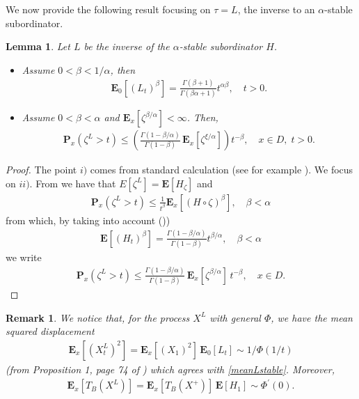 \documentclass[[11pt,a4paper,reqno]{article}
\newtheorem{lemma}{Lemma}
\newtheorem{remark}{Remark}[section]
\numberwithin{equation}{section}
\begin{document}
We now provide the following result focusing on $\tau=L$, the inverse to an $\alpha$-stable subordinator. 
\begin{lemma}
Let $L$ be the inverse of the $\alpha$-stable subordinator $H$. 
\begin{itemize}
\item[i)] Assume $0 < \beta < 1/\alpha$, then
\begin{align}
    \mathbf{E}_0[(L_t)^\beta] = \frac{\Gamma(\beta + 1)}{\Gamma(\beta \alpha + 1)} t^{\alpha \beta}, \quad t>0.
    \label{meanLstable}
\end{align}
\item[ii)] Assume $0< \beta < \alpha$ and $\mathbf{E}_x[\zeta^{\beta/\alpha}]< \infty$. Then, 
    \begin{align}
\mathbf{P}_x(\zeta^L > t) \leq \left( \frac{\Gamma(1-\beta/\alpha)}{\Gamma(1-\beta)} \, \mathbf{E}_x[\zeta^{\xi/\alpha}] \right) t^{-\beta}, \quad x \in D, \; t >0.
\end{align}
\end{itemize}
\end{lemma}

\begin{proof}
The point $i)$ comes from standard calculation (see for example \cite[formula 4.9]{ECPmd}). We focus on $ii)$. From \cite[Theorem 3.1]{CapDovDelRus} we have that $E[\zeta^L] = \mathbf{E}[H_{\zeta}]$ and
\begin{align*}
\mathbf{P}_x(\zeta^L > t) \leq \frac{1}{t^\beta} \mathbf{E}_x[(H\circ \zeta )^\beta], \quad \beta < \alpha
\end{align*}
from which, by taking into account (\cite[formula 4.7]{ECPmd}))
\begin{align}
    \mathbf{E}[(H_t)^\beta] = \frac{\Gamma(1-\beta/\alpha)}{\Gamma(1-\beta)} t^{\beta/\alpha}, \quad \beta < \alpha
    \label{momH}
\end{align}
we write
\begin{align*}
\mathbf{P}_x(\zeta^L > t) \leq \frac{\Gamma(1-\beta/\alpha)}{\Gamma(1-\beta)} \, \mathbf{E}_x[\zeta^{\beta/\alpha}] \, t^{-\beta}, \quad x \in D.
\end{align*}    
\end{proof}


\begin{remark}
We notice that, for the process $X^L$ with general $\Phi$, we have the mean squared displacement 
\begin{align}
\mathbf{E}_x[(X^L_t)^2] = \mathbf{E}_x[(X_1)^2] \, \mathbf{E}_0[L_t] \sim 1/\Phi(1/t)
\end{align}
(from Proposition 1, page 74 of \cite{Ber96}) which agrees with \eqref{meanLstable}. Moreover, 
\begin{align}
\mathbf{E}_x[T_{B}(X^L)] = \mathbf{E}_x[T_{B}(X^+)]\, \mathbf{E}[H_1] \sim \Phi^\prime(0).
\end{align}

\end{remark}
\end{document}
